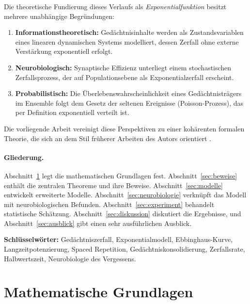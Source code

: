 ﻿\documentclass[12pt,a4paper,twoside]{article}
\theoremstyle{theormstyle}
\theoremstyle{proofstyle}
\begin{document}
	Die theoretische Fundierung dieses Verlaufs als \emph{Exponentialfunktion}
	besitzt mehrere unabhängige Begründungen:
	\begin{enumerate}[label=(\roman*)]
		\item \textbf{Informationstheoretisch:} Gedächtnisinhalte werden als
		Zustandsvariablen eines linearen dynamischen Systems modelliert, dessen
		Zerfall ohne externe Verstärkung exponentiell erfolgt.
		\item \textbf{Neurobiologisch:} Synaptische Effizienz unterliegt einem
		stochastischen Zerfallsprozess, der auf Populationsebene
		als Exponentialzerfall erscheint.
		\item \textbf{Probabilistisch:} Die Überlebenswahrscheinlichkeit
		eines Gedächtnisträgers im Ensemble folgt dem Gesetz der
		seltenen Ereignisse (Poisson-Prozess), das per Definition exponentiell
		verteilt ist.
	\end{enumerate}
	
	Die vorliegende Arbeit vereinigt diese Perspektiven zu einer kohärenten
	formalen Theorie, die sich an dem Stil früherer Arbeiten des Autors
	orientiert \citep{epp2026subgraph,epp2026biofalcon,epp2026vadis}.
	
	\paragraph{Gliederung.}
	Abschnitt~\ref{sec:grundlagen} legt die mathematischen Grundlagen fest.
	Abschnitt~\ref{sec:beweise} enthält die zentralen Theoreme und ihre Beweise.
	Abschnitt~\ref{sec:modelle} entwickelt erweiterte Modelle.
	Abschnitt~\ref{sec:neurobiologie} verknüpft das Modell mit neurobiologischen
	Befunden. Abschnitt~\ref{sec:experiment} behandelt statistische Schätzung.
	Abschnitt~\ref{sec:diskussion} diskutiert die Ergebnisse, und
	Abschnitt~\ref{sec:ausblick} gibt einen sehr ausführlichen Ausblick.
	
	\noindent\textbf{Schlüsselwörter:} Gedächtniszerfall, Exponentialmodell,
	Ebbinghaus-Kurve, Langzeitpotenzierung, Spaced Repetition, Gedächtniskonsolidierung,
	Zerfallsrate, Halbwertszeit, Neurobiologie des Vergessens.
	
	\section{Mathematische Grundlagen}
	\label{sec:grundlagen}
	
\end{document}
